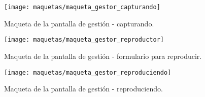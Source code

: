 \begin{figure}[!htp]
  \centering
  \texttt{[image: maquetas/maqueta\_gestor\_capturando]}
  \caption{Maqueta de la pantalla de gestión - capturando.}
  \label{fig:maqueta:gestor_capturando}
\end{figure}

\begin{figure}[!htp]
  \centering
  \texttt{[image: maquetas/maqueta\_gestor\_reproductor]}
  \caption{Maqueta de la pantalla de gestión - formulario para reproducir.}
  \label{fig:maqueta:gestor_reproductor}
\end{figure}

\begin{figure}[!htp]
  \centering
  \texttt{[image: maquetas/maqueta\_gestor\_reproduciendo]}
  \caption{Maqueta de la pantalla de gestión - reproduciendo.}
  \label{fig:maqueta:gestor_reproduciendo}
\end{figure}